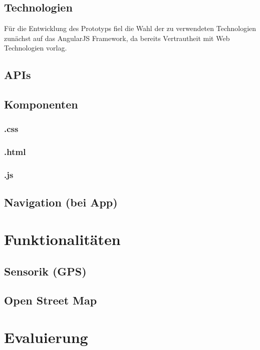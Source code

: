 \subsection{Technologien}
Für die Entwicklung des Prototyps fiel die Wahl der zu verwendeten Technologien zunächst auf
das AngularJS Framework, da bereits Vertrautheit mit Web Technologien vorlag.
\subsection{APIs}
\subsection{Komponenten}
\subsubsection{.css}
\subsubsection{.html}
\subsubsection{.js}
\subsection{Navigation (bei App)}
\section{Funktionalitäten}
\subsection{Sensorik (GPS)}
\subsection{Open Street Map}
\section{Evaluierung}
